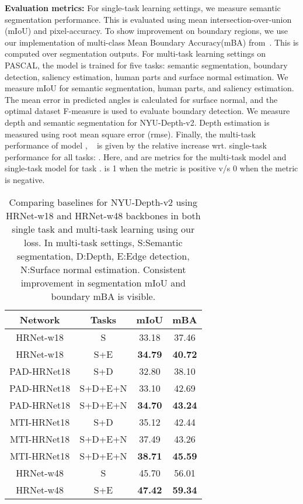 \documentclass[final]{cvpr}
\def\inv#1{{\color{blue}{\bf {w/ ours}}}}
\begin{document}
\noindent\textbf{Evaluation metrics:} For single-task learning settings, we measure semantic segmentation performance. This is evaluated using mean intersection-over-union (mIoU) and pixel-accuracy. To show improvement on boundary regions, we use our implementation of multi-class Mean Boundary Accuracy(mBA) from~\cite{cheng2020cascadepsp}. This is computed over segmentation outputs. 
For multi-task learning settings on PASCAL, the model is trained for five tasks: semantic segmentation, boundary detection, saliency estimation, human parts and surface normal estimation. We measure mIoU for semantic segmentation, human parts, and saliency estimation. The mean error in predicted angles is calculated for surface normal, and the optimal dataset F-measure is used to evaluate boundary detection. We measure depth and semantic segmentation for NYU-Depth-v2. Depth estimation is measured using root mean square error (rmse). Finally, the multi-task performance of model , ~\cite{maninis2019attentive} is given by the relative increase wrt. single-task performance for all tasks:
.
Here,  and  are metrics for the multi-task model and single-task model for task .  is 1 when the metric is positive v/s 0 when the metric is negative.

\begin{table}[t] 
\centering
 \begin{tabular}{c|c|cc} 
 \hline
 Network & Tasks &  mIoU & mBA \\ 
 \hline
 \hline
  HRNet-w18 & S & 33.18 & 37.46 \\ 
  HRNet-w18 \inv{} & S+E & \textbf{34.79} & \textbf{40.72} \\ 
 \hline
  PAD-HRNet18 & S+D & 32.80 & 38.10 \\   
  PAD-HRNet18 & S+D+E+N & 33.10 & 42.69 \\   
  PAD-HRNet18 \inv{} & S+D+E+N & \textbf{34.70} & \textbf{43.24} \\   
 \hline
  MTI-HRNet18 & S+D & 35.12 & 42.44 \\
  MTI-HRNet18 & S+D+E+N & 37.49 & 43.26 \\
  MTI-HRNet18 \inv{} & S+D+E+N & \textbf{38.71} & \textbf{45.59} \\
 \hline
  HRNet-w48 & S & 45.70 & 56.01 \\ 
  HRNet-w48 \inv{} & S+E & \textbf{47.42} & \textbf{59.34} \\
 \hline
\end{tabular}
\caption{Comparing baselines for NYU-Depth-v2 using HRNet-w18 and HRNet-w48 backbones in both single task and multi-task learning using our loss. In multi-task settings, S:Semantic segmentation, D:Depth, E:Edge detection, N:Surface normal estimation. Consistent improvement in segmentation mIoU and boundary mBA is visible.}\label{tab:nyud}
\end{table}
\end{document}
